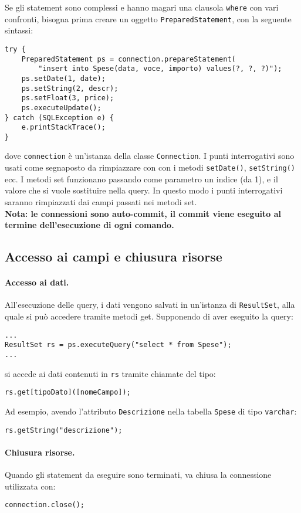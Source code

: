 \documentclass[a4paper, 10pt]{article}
\begin{document}
Se gli statement sono complessi e hanno magari una clausola \lstinline|where| con vari confronti, bisogna prima creare un oggetto \lstinline|PreparedStatement|, con la seguente sintassi:

\begin{lstlisting}
try {
	PreparedStatement ps = connection.prepareStatement(
		"insert into Spese(data, voce, importo) values(?, ?, ?)");
	ps.setDate(1, date);
	ps.setString(2, descr);
	ps.setFloat(3, price);
	ps.executeUpdate();
} catch (SQLException e) {
	e.printStackTrace();
}
\end{lstlisting}
dove \lstinline|connection| è un'istanza della classe \lstinline|Connection|. I punti interrogativi sono usati come segnaposto da rimpiazzare con con i metodi \lstinline|setDate()|, \lstinline|setString()| ecc.
I metodi set funzionano passando come parametro un indice (da 1), e il valore che si vuole sostituire nella query. In questo modo i punti interrogativi saranno rimpiazzati dai campi passati nei metodi set. \\

\noindent
\textbf{Nota: le connessioni sono auto-commit, il commit viene eseguito al termine dell'esecuzione di ogni comando.}

\subsection{Accesso ai campi e chiusura risorse}
\paragraph{Accesso ai dati.}
All'esecuzione delle query, i dati vengono salvati in un'istanza di \lstinline|ResultSet|, alla quale si può accedere tramite metodi get.
Supponendo di aver eseguito la query:
\begin{lstlisting}
...
ResultSet rs = ps.executeQuery("select * from Spese");
...
\end{lstlisting}
si accede ai dati contenuti in \lstinline|rs| tramite chiamate del tipo:
\begin{lstlisting}
rs.get[tipoDato]([nomeCampo]);
\end{lstlisting}

Ad esempio, avendo l'attributo \lstinline|Descrizione| nella tabella \lstinline|Spese| di tipo \lstinline|varchar|:
\begin{lstlisting}
rs.getString("descrizione");
\end{lstlisting}

\paragraph{Chiusura risorse.}
Quando gli statement da eseguire sono terminati, va chiusa la connessione utilizzata con:
\begin{lstlisting}
connection.close();
\end{lstlisting}
\end{document}

